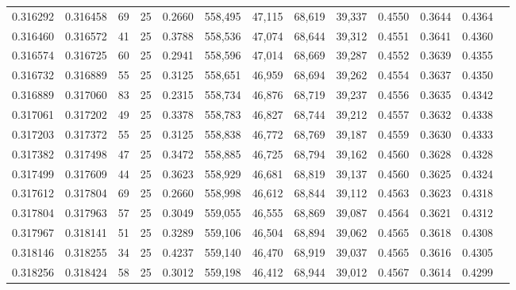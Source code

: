 \begin{tabular}{rrrrrrrrrrrrr}
0.316292 & 0.316458 &    69 &  25 &                                     0.2660 & 558,495 &  47,115 &  68,619 &  39,337 & 0.4550 & 0.3644 & 0.4364 \\
0.316460 & 0.316572 &    41 &  25 &                                     0.3788 & 558,536 &  47,074 &  68,644 &  39,312 & 0.4551 & 0.3641 & 0.4360 \\
0.316574 & 0.316725 &    60 &  25 &                                     0.2941 & 558,596 &  47,014 &  68,669 &  39,287 & 0.4552 & 0.3639 & 0.4355 \\
0.316732 & 0.316889 &    55 &  25 &                                     0.3125 & 558,651 &  46,959 &  68,694 &  39,262 & 0.4554 & 0.3637 & 0.4350 \\
0.316889 & 0.317060 &    83 &  25 &                                     0.2315 & 558,734 &  46,876 &  68,719 &  39,237 & 0.4556 & 0.3635 & 0.4342 \\
0.317061 & 0.317202 &    49 &  25 &                                     0.3378 & 558,783 &  46,827 &  68,744 &  39,212 & 0.4557 & 0.3632 & 0.4338 \\
0.317203 & 0.317372 &    55 &  25 &                                     0.3125 & 558,838 &  46,772 &  68,769 &  39,187 & 0.4559 & 0.3630 & 0.4333 \\
0.317382 & 0.317498 &    47 &  25 &                                     0.3472 & 558,885 &  46,725 &  68,794 &  39,162 & 0.4560 & 0.3628 & 0.4328 \\
0.317499 & 0.317609 &    44 &  25 &                                     0.3623 & 558,929 &  46,681 &  68,819 &  39,137 & 0.4560 & 0.3625 & 0.4324 \\
0.317612 & 0.317804 &    69 &  25 &                                     0.2660 & 558,998 &  46,612 &  68,844 &  39,112 & 0.4563 & 0.3623 & 0.4318 \\
0.317804 & 0.317963 &    57 &  25 &                                     0.3049 & 559,055 &  46,555 &  68,869 &  39,087 & 0.4564 & 0.3621 & 0.4312 \\
0.317967 & 0.318141 &    51 &  25 &                                     0.3289 & 559,106 &  46,504 &  68,894 &  39,062 & 0.4565 & 0.3618 & 0.4308 \\
0.318146 & 0.318255 &    34 &  25 &                                     0.4237 & 559,140 &  46,470 &  68,919 &  39,037 & 0.4565 & 0.3616 & 0.4305 \\
0.318256 & 0.318424 &    58 &  25 &                                     0.3012 & 559,198 &  46,412 &  68,944 &  39,012 & 0.4567 & 0.3614 & 0.4299 \\

\end{tabular}
